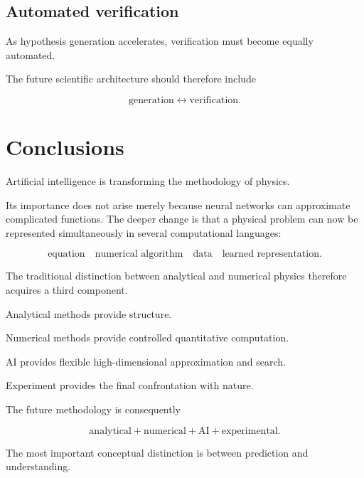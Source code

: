 \documentclass[11pt,a4paper,oneside]{book}
\begin{document}
\section{Automated verification}

As hypothesis generation accelerates, verification must become equally
automated.

The future scientific architecture should therefore include

\begin{equation}
\text{generation}
\longleftrightarrow
\text{verification}.
\end{equation}

\chapter{Conclusions}

Artificial intelligence is transforming the methodology of physics.

Its importance does not arise merely because neural networks can approximate
complicated functions. The deeper change is that a physical problem can now be
represented simultaneously in several computational languages:

\begin{equation}
\boxed{
\text{equation}
\quad
\text{numerical algorithm}
\quad
\text{data}
\quad
\text{learned representation}.
}
\end{equation}

The traditional distinction between analytical and numerical physics therefore
acquires a third component.

Analytical methods provide structure.

Numerical methods provide controlled quantitative computation.

AI provides flexible high-dimensional approximation and search.

Experiment provides the final confrontation with nature.

The future methodology is consequently

\begin{equation}
\boxed{
\text{analytical}
+
\text{numerical}
+
\text{AI}
+
\text{experimental}
}.
\end{equation}

The most important conceptual distinction is between prediction and
understanding.
\end{document}
